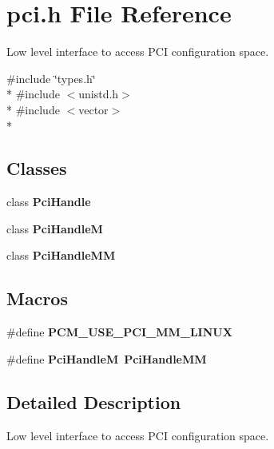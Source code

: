 \section{pci.\+h File Reference}
\label{pci_8h}


Low level interface to access P\+C\+I configuration space.  


{\ttfamily \#include \char`\"{}types.\+h\char`\"{}}\\*
{\ttfamily \#include $<$unistd.\+h$>$}\\*
{\ttfamily \#include $<$vector$>$}\\*
\subsection*{Classes}
\begin{DoxyCompactItemize}
\item 
class {\bf Pci\+Handle}
\item 
class {\bf Pci\+Handle\+M}
\item 
class {\bf Pci\+Handle\+M\+M}
\end{DoxyCompactItemize}
\subsection*{Macros}
\begin{DoxyCompactItemize}
\item 
\#define {\bfseries P\+C\+M\+\_\+\+U\+S\+E\+\_\+\+P\+C\+I\+\_\+\+M\+M\+\_\+\+L\+I\+N\+U\+X}\label{pci_8h_a971b727353c43affea5aeaca4748371a}

\item 
\#define {\bfseries Pci\+Handle\+M}~{\bf Pci\+Handle\+M\+M}\label{pci_8h_a4933174ae6640df9fb81a25f36218314}

\end{DoxyCompactItemize}


\subsection{Detailed Description}
Low level interface to access P\+C\+I configuration space. 

